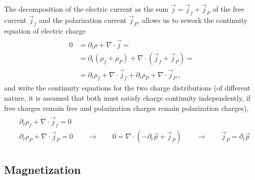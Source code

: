 \documentclass[letterpaper,10pt,english]{jupyterBook}
\begin{document}
\sphinxAtStartPar
The decomposition of the electric current as the sum \(\vec{j} = \vec{j}_f + \vec{j}_P\) of the free current \(\vec{j}_f\) and the polarization current \(\vec{j}_P\), allows us to rework the continuity equation of electric charge
\begin{equation*}
\begin{split}\begin{aligned}
  0 & = \partial_t \rho + \nabla \cdot \vec{j} = \\
    & = \partial_t (\rho_f + \rho_P) + \nabla \cdot \left( \vec{j}_f + \vec{j}_P \right) = \\
    & = \partial_t \rho_f + \nabla \cdot  \vec{j}_f + \partial_t \rho_P + \nabla \cdot \vec{j}_P \ ,
\end{aligned}\end{split}
\end{equation*}
\sphinxAtStartPar
and write the continuity equations for the two charge distributions (of different nature, it is assumed that both must satisfy charge continuity independently, if free charges remain free and polarization charges remain polarization charges),
\begin{equation*}
\begin{split}\begin{aligned}
  & \partial_t \rho_f + \nabla \cdot \vec{j}_f = 0 \\
  & \partial_t \rho_P + \nabla \cdot \vec{j}_P = 0 \qquad \rightarrow \qquad 0 = \nabla \cdot (-\partial_t \vec{p} + \vec{j}_P) \qquad \rightarrow \qquad \vec{j}_P = \partial_t \vec{p}
\end{aligned}\end{split}
\end{equation*}
\sphinxAtStartPar
{} 

\sphinxstepscope


\subsection{Magnetization}
\label{\detokenize{ch/principles-matter-magnetization:magnetization}}\label{\detokenize{ch/principles-matter-magnetization:classical-electromagnetism-media-magnetization}}\label{\detokenize{ch/principles-matter-magnetization::doc}}
\end{document}
